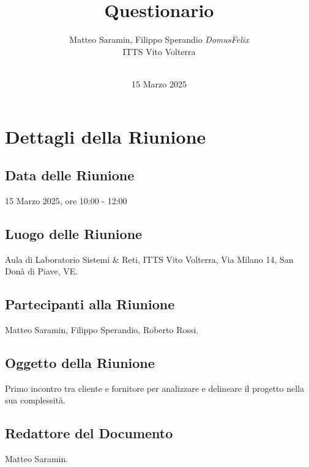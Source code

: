\documentclass{exam}
\title{\huge{Questionario}}
\author{Matteo Saramin, Filippo Sperandio \textit{DomusFelix} \\ {\small ITTS Vito Volterra} \\ \\ }
\date{15 Marzo 2025}
\begin{document}
\maketitle

\section{Dettagli della Riunione}
\subsection{Data delle Riunione}
\hspace*{1cm}15 Marzo 2025, ore 10:00 - 12:00
\subsection{Luogo delle Riunione}
\hspace*{1cm}Aula di Laboratorio Sistemi \& Reti, ITTS Vito Volterra, Via Milano 14, San Donà di Piave, VE.
\subsection{Partecipanti alla Riunione}
\hspace*{1cm}Matteo Saramin, Filippo Sperandio, Roberto Rossi.
\subsection{Oggetto della Riunione}
\hspace*{1cm}Primo incontro tra cliente e fornitore per analizzare e delineare il progetto nella sua complessità.
\subsection{Redattore del Documento}
\hspace*{1cm}Matteo Saramin.
\end{document}
